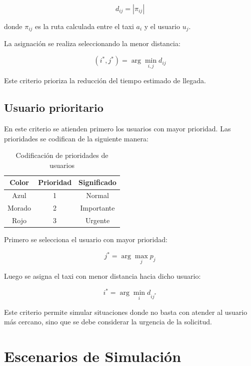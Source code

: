 \documentclass[12pt,a4paper]{article}
\begin{document}
\begin{equation}
d_{ij} = |\pi_{ij}|
\end{equation}

donde $\pi_{ij}$ es la ruta calculada entre el taxi $a_i$ y el usuario $u_j$.

La asignación se realiza seleccionando la menor distancia:

\begin{equation}
(i^*,j^*) = \arg\min_{i,j} d_{ij}
\end{equation}

Este criterio prioriza la reducción del tiempo estimado de llegada.

\subsection{Usuario prioritario}

En este criterio se atienden primero los usuarios con mayor prioridad. Las prioridades se codifican de la siguiente manera:

\begin{table}[H]
\centering
\caption{Codificación de prioridades de usuarios}
\begin{tabular}{ccc}
\toprule
\textbf{Color} & \textbf{Prioridad} & \textbf{Significado} \\
\midrule
Azul & 1 & Normal \\
Morado & 2 & Importante \\
Rojo & 3 & Urgente \\
\bottomrule
\end{tabular}
\end{table}

Primero se selecciona el usuario con mayor prioridad:

\begin{equation}
j^* = \arg\max_j p_j
\end{equation}

Luego se asigna el taxi con menor distancia hacia dicho usuario:

\begin{equation}
i^* = \arg\min_i d_{ij^*}
\end{equation}

Este criterio permite simular situaciones donde no basta con atender al usuario más cercano, sino que se debe considerar la urgencia de la solicitud.

\section{Escenarios de Simulación}
\justifying
\end{document}
